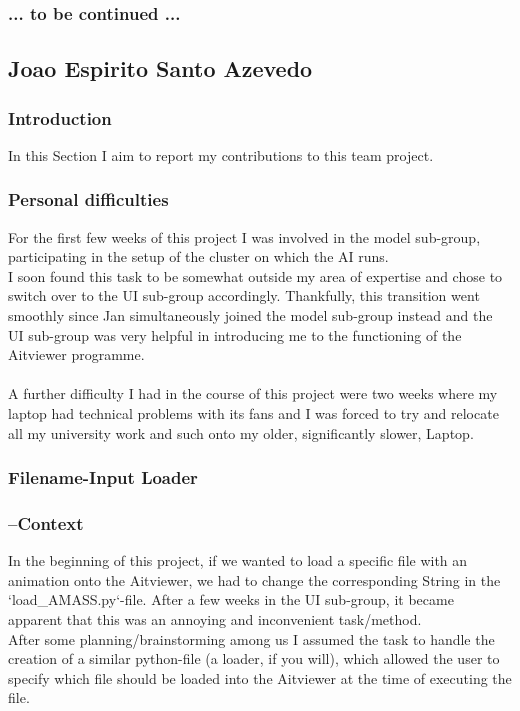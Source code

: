 \documentclass[a4paper]{scrartcl}
\begin{document}
\subsubsection*{... to be continued ...}


\subsection*{Joao Espirito Santo Azevedo}
\subsubsection*{Introduction}
In this Section I aim to report my contributions to this team project.\\

\subsubsection*{Personal difficulties}
For the first few weeks of this project I was involved in the model sub-group, participating in the setup of the cluster on which the AI runs.\\

I soon found this task to be somewhat outside my area of expertise and chose to switch over to the UI sub-group accordingly. Thankfully, this transition went smoothly since Jan simultaneously joined the model sub-group instead and the UI sub-group was very helpful in introducing me to the functioning of the Aitviewer programme.\\
\\
A further difficulty I had in the course of this project were two weeks where my laptop had technical problems with its fans and I was forced to try and relocate all my university work and such onto my older, significantly slower, Laptop.

\subsubsection*{Filename-Input Loader}
\subsubsection*{--Context}
In the beginning of this project, if we wanted to load a specific file with an animation onto the Aitviewer, we had to change the corresponding String in the `load\_AMASS.py`-file. After a few weeks in the UI sub-group, it became apparent that this was an annoying and inconvenient task/method.
\\
After some planning/brainstorming among us I assumed the task to handle the creation of a similar python-file (a loader, if you will), which allowed the user to specify which file should be loaded into the Aitviewer at the time of executing the file.
\end{document}
